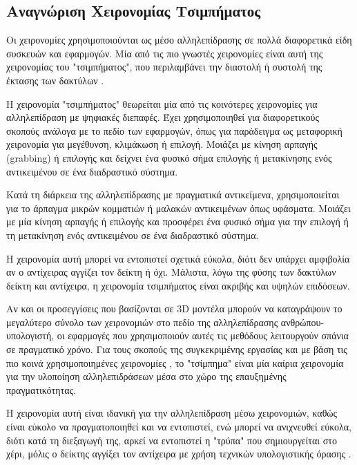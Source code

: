 \subsection{Αναγνώριση Χειρονομίας Τσιμπήματος} \label{ssection:pinch}

Οι χειρονομίες χρησιμοποιούνται ως μέσο αλληλεπίδρασης σε πολλά διαφορετικά είδη συσκευών και εφαρμογών. Μία από τις πιο γνωστές χειρονομίες είναι αυτή της χειρονομίας του "τσιμπήματος", που περιλαμβάνει την διαστολή ή συστολή της έκτασης των δακτύλων \cite{hoggan2013multi}.


Η χειρονομία "τσιμπήματος" θεωρείται μία από τις κοινότερες χειρονομίες για αλληλεπίδραση με ψηφιακές διεπαφές. 
Έχει χρησιμοποιηθεί για διαφορετικούς σκοπούς ανάλογα με το πεδίο των εφαρμογών, όπως για παράδειγμα ως μεταφορική χειρονομία για μεγέθυνση, κλιμάκωση ή επιλογή. Μοιάζει με κίνηση αρπαγής (grabbing) ή επιλογής και δείχνει ένα φυσικό σήμα επιλογής ή μετακίνησης ενός αντικειμένου σε ένα διαδραστικό σύστημα. 


Κατά τη διάρκεια της αλληλεπίδρασης με πραγματικά αντικείμενα, χρησιμοποιείται για το άρπαγμα μικρών κομματιών ή μαλακών αντικειμένων όπως υφάσματα. Μοιάζει με μία κίνηση αρπαγής ή επιλογής και προσφέρει ένα φυσικό σήμα για την επιλογή ή τη μετακίνηση ενός αντικειμένου σε ένα διαδραστικό σύστημα.



Η χειρονομία αυτή μπορεί να εντοπιστεί σχετικά εύκολα, διότι δεν υπάρχει αμφιβολία αν ο αντίχειρας αγγίζει τον δείκτη ή όχι. Μάλιστα, λόγω της φύσης των δακτύλων δείκτη και αντίχειρα, η χειρονομία τσιμπήματος είναι ακριβής και υψηλών επιδόσεων.



Αν και οι προσεγγίσεις που βασίζονται σε 3D μοντέλα μπορούν να καταγράψουν το μεγαλύτερο σύνολο των χειρονομιών στο πεδίο της αλληλεπίδρασης ανθρώπου-υπολογιστή, οι εφαρμογές που χρησιμοποιούν αυτές τις μεθόδους λειτουργούν σπάνια σε πραγματικό χρόνο. Για τους σκοπούς της συγκεκριμένης εργασίας και με βάση τις πιο κοινά χρησιμοποιημένες χειρονομίες \cite{Piumsomboon2013}, το "τσίμπημα" είναι μία καίρια χειρονομία για την υλοποίηση αλληλεπιδράσεων μέσα στο χώρο της επαυξημένης πραγματικότητας.


Η χειρονομία αυτή είναι ιδανική για την αλληλεπίδραση μέσω χειρονομιών, καθώς είναι εύκολο να πραγματοποιηθεί και να εντοπιστεί, ενώ μπορεί να ανιχνευθεί εύκολα, διότι κατά τη διεξαγωγή της, αρκεί να εντοπιστεί η "τρύπα" που σημιουργείται στο χέρι, μόλις ο δείκτης αγγίξει τον αντίχειρα με χρήση τεχνικών υπολογιστικής όρασης \cite{Wilson2006}.



